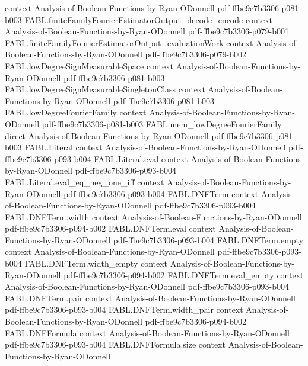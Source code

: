 \begin{theorem}
  {context}
  {Analysis-of-Boolean-Functions-by-Ryan-ODonnell}
  {pdf-ffbe9c7b3306-p081-b003}
\proofstep
  {FABL.finiteFamilyFourierEstimatorOutput_decode_encode}
  {context}
  {Analysis-of-Boolean-Functions-by-Ryan-ODonnell}
  {pdf-ffbe9c7b3306-p079-b001}
\proofstep
  {FABL.finiteFamilyFourierEstimatorOutput_evaluationWork}
  {context}
  {Analysis-of-Boolean-Functions-by-Ryan-ODonnell}
  {pdf-ffbe9c7b3306-p079-b002}
\proofstep
  {FABL.lowDegreeSignMeasurableSpace}
  {context}
  {Analysis-of-Boolean-Functions-by-Ryan-ODonnell}
  {pdf-ffbe9c7b3306-p081-b003}
\proofstep
  {FABL.lowDegreeSignMeasurableSingletonClass}
  {context}
  {Analysis-of-Boolean-Functions-by-Ryan-ODonnell}
  {pdf-ffbe9c7b3306-p081-b003}
\proofstep
  {FABL.lowDegreeFourierFamily}
  {context}
  {Analysis-of-Boolean-Functions-by-Ryan-ODonnell}
  {pdf-ffbe9c7b3306-p081-b003}
\proofstep
  {FABL.mem_lowDegreeFourierFamily}
  {direct}
  {Analysis-of-Boolean-Functions-by-Ryan-ODonnell}
  {pdf-ffbe9c7b3306-p081-b003}
\proofstep
  {FABL.Literal}
  {context}
  {Analysis-of-Boolean-Functions-by-Ryan-ODonnell}
  {pdf-ffbe9c7b3306-p093-b004}
\proofstep
  {FABL.Literal.eval}
  {context}
  {Analysis-of-Boolean-Functions-by-Ryan-ODonnell}
  {pdf-ffbe9c7b3306-p093-b004}
\proofstep
  {FABL.Literal.eval_eq_neg_one_iff}
  {context}
  {Analysis-of-Boolean-Functions-by-Ryan-ODonnell}
  {pdf-ffbe9c7b3306-p093-b004}
\proofstep
  {FABL.DNFTerm}
  {context}
  {Analysis-of-Boolean-Functions-by-Ryan-ODonnell}
  {pdf-ffbe9c7b3306-p093-b004}
\proofstep
  {FABL.DNFTerm.width}
  {context}
  {Analysis-of-Boolean-Functions-by-Ryan-ODonnell}
  {pdf-ffbe9c7b3306-p094-b002}
\proofstep
  {FABL.DNFTerm.eval}
  {context}
  {Analysis-of-Boolean-Functions-by-Ryan-ODonnell}
  {pdf-ffbe9c7b3306-p093-b004}
\proofstep
  {FABL.DNFTerm.empty}
  {context}
  {Analysis-of-Boolean-Functions-by-Ryan-ODonnell}
  {pdf-ffbe9c7b3306-p093-b004}
\proofstep
  {FABL.DNFTerm.width_empty}
  {context}
  {Analysis-of-Boolean-Functions-by-Ryan-ODonnell}
  {pdf-ffbe9c7b3306-p094-b002}
\proofstep
  {FABL.DNFTerm.eval_empty}
  {context}
  {Analysis-of-Boolean-Functions-by-Ryan-ODonnell}
  {pdf-ffbe9c7b3306-p093-b004}
\proofstep
  {FABL.DNFTerm.pair}
  {context}
  {Analysis-of-Boolean-Functions-by-Ryan-ODonnell}
  {pdf-ffbe9c7b3306-p093-b004}
\proofstep
  {FABL.DNFTerm.width_pair}
  {context}
  {Analysis-of-Boolean-Functions-by-Ryan-ODonnell}
  {pdf-ffbe9c7b3306-p094-b002}
\proofstep
  {FABL.DNFFormula}
  {context}
  {Analysis-of-Boolean-Functions-by-Ryan-ODonnell}
  {pdf-ffbe9c7b3306-p093-b004}
\proofstep
  {FABL.DNFFormula.size}
  {context}
  {Analysis-of-Boolean-Functions-by-Ryan-ODonnell}

\end{theorem}
